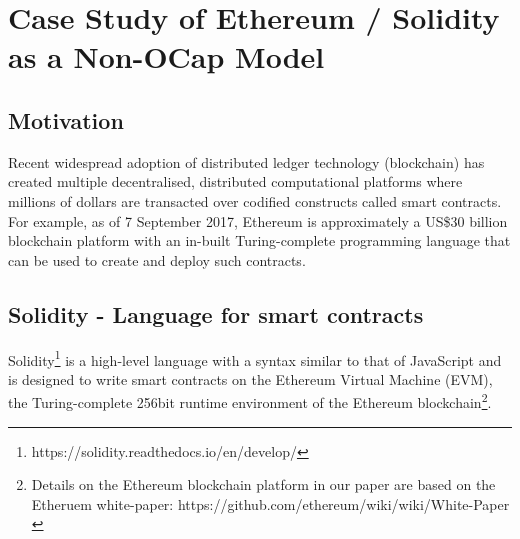 \documentclass[a4paper,11pt,twoside]{article}
\begin{document}
{\section{Case Study of Ethereum / Solidity as a Non-OCap Model}\label{sec:ethereum}

\subsection{Motivation}
Recent widespread adoption of distributed ledger technology (blockchain) has created multiple decentralised, distributed computational platforms where millions of dollars are transacted over codified constructs called smart contracts. For example, as of 7 September 2017, Ethereum\cite{wood2014} is approximately a US\$30 billion blockchain platform with an in-built Turing-complete programming language that can be used to create and deploy such contracts.

\subsection{Solidity - Language for smart contracts}
Solidity\footnote{https://solidity.readthedocs.io/en/develop/} is a high-level language with a syntax similar to that of JavaScript and is designed to write smart contracts on the Ethereum Virtual Machine (EVM), the Turing-complete 256bit runtime environment of the Ethereum blockchain\footnote{Details on the Ethereum blockchain platform in our paper are based on the Etheruem white-paper: https://github.com/ethereum/wiki/wiki/White-Paper\\}.

}
\end{document}
